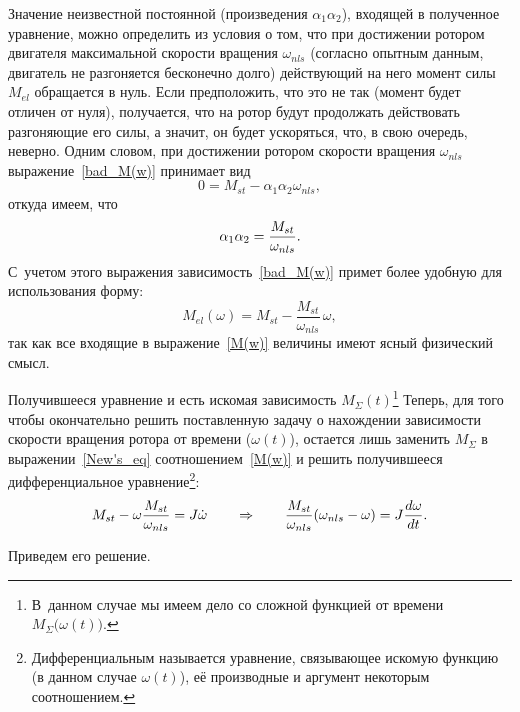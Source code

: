 \documentclass[12pt,a4paper,openany]{extarticle}
\begin{document}
Значение неизвестной постоянной (произведения $\alpha_1\alpha_2$), входящей в полученное уравнение, можно определить из условия о том, что при достижении ротором двигателя максимальной скорости вращения $\omega_{nls}$ (согласно опытным данным, двигатель не разгоняется бесконечно долго) действующий на него момент силы $M_{el}$ обращается в нуль. 
Если предположить, что это не так (момент будет отличен от нуля), получается, что на ротор будут продолжать действовать разгоняющие его силы, а значит, он будет ускоряться, что, в свою очередь, неверно. 
Одним словом, при достижении ротором скорости вращения $\omega_{nls}$ выражение~\eqref{bad_M(w)} принимает вид
\begin{equation*}\label{M(w0)}
	0 = M_{st} - \alpha_1\alpha_2\omega_{nls},
\end{equation*} 
откуда имеем, что
\begin{equation}\label{a1a2}
	\alpha_1\alpha_2 = \frac{M_{st}}{\omega_{nls}}\ldotp
\end{equation}
С~учетом этого выражения зависимость~\eqref{bad_M(w)} примет более удобную для использования форму:
\begin{equation}\label{M(w)}
	M_{el}(\omega) = M_{st} - \frac{M_{st}}{\omega_{nls}}\,\omega,
\end{equation}
так как все входящие в выражение~\eqref{M(w)} величины имеют ясный физический смысл.

Получившееся уравнение и есть искомая зависимость $M_\varSigma(t)$\footnote{В~данном случае мы имеем дело со сложной функцией от времени $M_\varSigma\bigl(\omega(t)\bigr)$.}
Теперь, для того чтобы окончательно решить поставленную задачу о нахождении зависимости скорости вращения ротора от времени ($\omega(t)$), остается лишь заменить $M_\varSigma$ в выражении~\eqref{New's_eq} соотношением~\eqref{M(w)} и решить получившееся дифференциальное уравнение\footnote{Дифференциальным называется уравнение, связывающее искомую функцию (в данном случае $\omega(t)$), её производные и аргумент некоторым соотношением.}:
\begin{equation}\label{diffur}
	M_{st} - \omega\frac{M_{st}}{\omega_{nls}} = J\dot\omega \qquad \Rightarrow \qquad 
	\frac{M_{st}}{\omega_{nls}}(\omega_{nls} - \omega) = J\frac{d\omega}{dt}\ldotp
\end{equation}

Приведем его решение.
\end{document}
